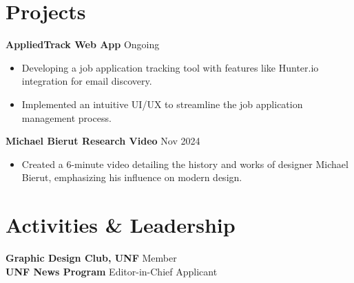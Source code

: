 \documentclass[10pt]{article}
\begin{document}
\section*{Projects}
\textbf{AppliedTrack Web App} \hfill Ongoing
\begin{itemize}[leftmargin=0.15in]
    \item Developing a job application tracking tool with features like Hunter.io integration for email discovery.
    \item Implemented an intuitive UI/UX to streamline the job application management process.
\end{itemize}

\textbf{Michael Bierut Research Video} \hfill Nov 2024
\begin{itemize}[leftmargin=0.15in]
    \item Created a 6-minute video detailing the history and works of designer Michael Bierut, emphasizing his influence on modern design.
\end{itemize}

\section*{Activities & Leadership}
\textbf{Graphic Design Club, UNF} \hfill Member \\
\textbf{UNF News Program} \hfill Editor-in-Chief Applicant
\end{document}
